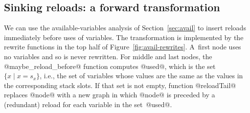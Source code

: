 \documentclass[blockstyle,preprint,nocopyrightspace]{sigplanconf}
\newcommand\slotof[1]{\ensuremath{s_{#1}}}
\newcommand{\authornote}[1]{{\em #1}}
\newcommand{\john}[1]{\authornote{JD: #1}}
\newcommand\secref[1]{Section~\ref{sec:#1}}
\newcommand\seclabel[1]{\label{sec:#1}}
\newcommand\figref[1]{Figure~\ref{fig:#1}}
\begin{document}





\subsection{Sinking reloads: a forward transformation}

\seclabel{sink-reloads}

We can use the available-variables analysis of \secref{avail} to
insert reloads
immediately before uses of variables.
The transformation is implemented by the rewrite functions in the top
half of \figref{avail-rewrites}.
A~first node uses no variables and so is never rewritten.
For middle and last nodes, the @maybe_reload_before@ function
computes @used@, which is the set $\{ x \mid x = \slotof x\}$, i.e., 
the set of variables whose values are the same as the values in the
corresponding stack slots.
If that set is not empty, function
@reloadTail@ replaces @node@ with a new graph in which @node@ is
preceded by a (redundant) reload for each variable in the set~@used@.
\end{document}
